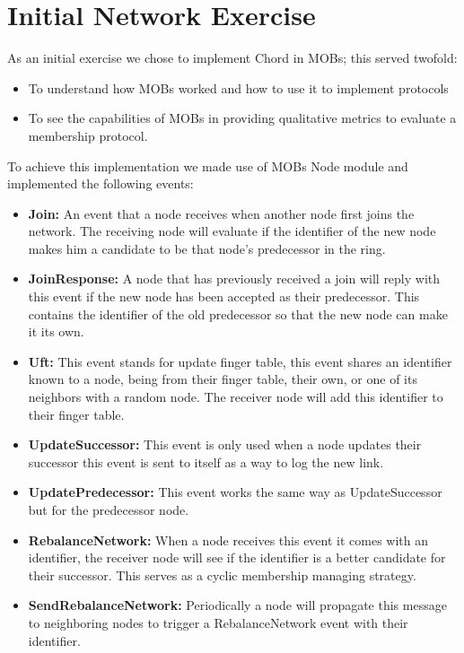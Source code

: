 \section{Initial Network Exercise}\label{sub:initial_exercise}

As an initial exercise we chose to implement Chord in MOBs; this served twofold:

\begin{itemize}
  \item To understand how MOBs worked and how to use it to implement protocols
  \item To see the capabilities of MOBs in providing qualitative metrics to evaluate
a membership protocol.
\end{itemize}

To achieve this implementation we made use of MOBs Node module and implemented the
following events:

\begin{itemize}
  \item \textbf{Join: } An event that a node receives when another node first joins
the network. The receiving node will evaluate if the identifier of the new node makes him
a candidate to be that node's predecessor in the ring.
  \item \textbf{JoinResponse: } A node that has previously received a join will reply
with this event if the new node has been accepted as their predecessor. This contains
the identifier of the old predecessor so that the new node can make it its own.
  \item \textbf{Uft: } This event stands for update finger table, this event shares
an identifier known to a node, being from their finger table, their own, or one of
its neighbors with a random node. The receiver node will add this identifier to their finger table.
  \item \textbf{UpdateSuccessor: } This event is only used when a node updates their successor
this event is sent to itself as a way to log the new link.
  \item \textbf{UpdatePredecessor: } This event works the same way as UpdateSuccessor
but for the predecessor node.
  \item \textbf{RebalanceNetwork: } When a node receives this event it comes with
an identifier, the receiver node will see if the identifier is a better candidate for
their successor. This serves as a cyclic membership managing strategy.
  \item \textbf{SendRebalanceNetwork: } Periodically a node will propagate this message
to neighboring nodes to trigger a RebalanceNetwork event with their identifier.
\end{itemize}

